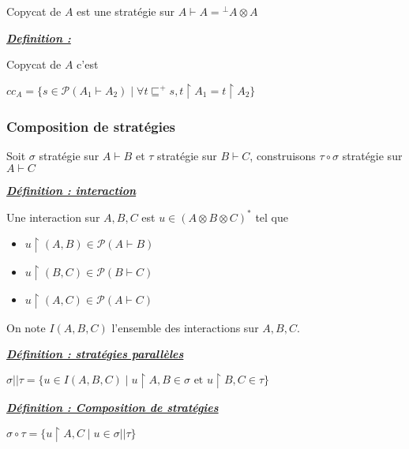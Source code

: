 \documentclass[a4paper,12ptCOUCOU
]{article}
\newlength{\mydepth}
\newlength{\myheight}
\newenvironment{answer}[1]
{\vspace{0.5cm}\begin{minipage}{\linewidth}\textbf{\textit{\underline{#1}}}\par\begin{lrbox}{\mybox}\quad\begin{minipage}{\linewidth}\color{black}\setlength{\parskip}{10pt}}
{\end{minipage}\end{lrbox}
\settodepth{\mydepth}{\usebox{\mybox}}
\settoheight{\myheight}{\usebox{\mybox}}
\addtolength{\myheight}{\mydepth}
\noindent\makebox[0pt]{
  \color{gray}\hspace{-0pt}\rule[-\mydepth]{1pt}{\myheight}}
\usebox{\mybox}
\end{minipage}
  }
\begin{document}
Copycat de $A$ est une stratégie sur $A \vdash A = {}^\bot A \otimes A$

\begin{answer}{Definition :}
Copycat de $A$ c'est

$cc_A=\{s \in \mathcal{P}(A_1 \vdash A_2) \mid \forall t \sqsubseteq^+ s, t \upharpoonright A_1 = t \upharpoonright A_2\}$
\end{answer}


\subsubsection{Composition de stratégies}

Soit $\sigma$ stratégie sur $A\vdash B$ et $\tau$ stratégie sur $B \vdash C$,
construisons $\tau \circ \sigma$ stratégie sur $A \vdash C$

\begin{answer}{Définition : interaction}

Une interaction sur $A, B, C$ est $u \in (A \otimes B \otimes C)^*$ tel que
\begin{itemize}
\item $u \upharpoonright (A, B) \in \mathcal{P}(A \vdash B)$
\item $u \upharpoonright (B, C) \in \mathcal{P}(B \vdash C)$
\item $u \upharpoonright (A, C) \in \mathcal{P}(A \vdash C)$
\end{itemize}
\end{answer}

On note $I(A,B,C)$ l'ensemble des interactions sur $A,B,C$.

\begin{answer}{Définition : stratégies parallèles}
$\sigma || \tau = \{u \in I(A,B,C) \mid u \upharpoonright A,B \in \sigma \text{ et }u \upharpoonright B,C \in \tau\}$
\end{answer}

\begin{answer}{Définition : Composition de stratégies}
$\sigma \circ \tau = \{u \upharpoonright A,C \mid u \in \sigma || \tau\}$
\end{answer}
\end{document}
